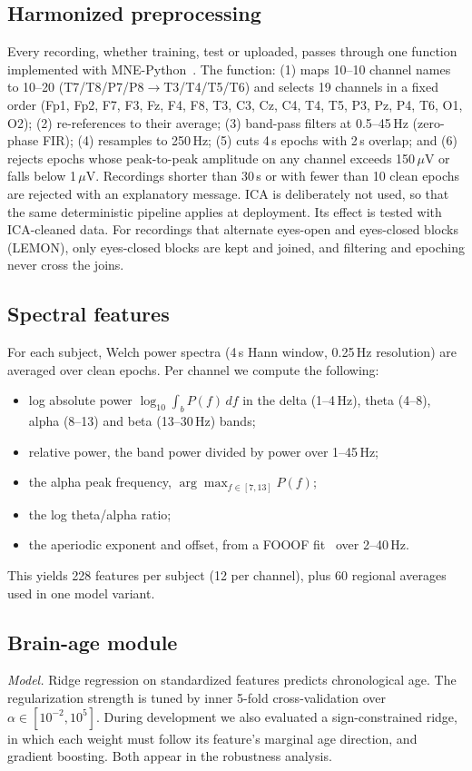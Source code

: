 \documentclass[journal]{IEEEtran}
\begin{document}
\subsection{Harmonized preprocessing}
Every recording, whether training, test or uploaded, passes through one function implemented with MNE-Python~\cite{mne}. The function: (1) maps 10--10 channel names to 10--20 (T7/T8/P7/P8$\rightarrow$T3/T4/T5/T6) and selects 19 channels in a fixed order (Fp1, Fp2, F7, F3, Fz, F4, F8, T3, C3, Cz, C4, T4, T5, P3, Pz, P4, T6, O1, O2); (2) re-references to their average; (3) band-pass filters at 0.5--45\,Hz (zero-phase FIR); (4) resamples to 250\,Hz; (5) cuts 4\,s epochs with 2\,s overlap; and (6) rejects epochs whose peak-to-peak amplitude on any channel exceeds 150\,$\mu$V or falls below 1\,$\mu$V. Recordings shorter than 30\,s or with fewer than 10 clean epochs are rejected with an explanatory message. ICA is deliberately not used, so that the same deterministic pipeline applies at deployment. Its effect is tested with ICA-cleaned data. For recordings that alternate eyes-open and eyes-closed blocks (LEMON), only eyes-closed blocks are kept and joined, and filtering and epoching never cross the joins.

\subsection{Spectral features}
For each subject, Welch power spectra (4\,s Hann window, 0.25\,Hz resolution) are averaged over clean epochs. Per channel we compute the following:
\begin{itemize}
\item log absolute power $\log_{10}\!\int_{b} P(f)\,df$ in the delta (1--4\,Hz), theta (4--8), alpha (8--13) and beta (13--30\,Hz) bands;
\item relative power, the band power divided by power over 1--45\,Hz;
\item the alpha peak frequency, $\arg\max_{f\in[7,13]}P(f)$;
\item the log theta/alpha ratio;
\item the aperiodic exponent and offset, from a FOOOF fit~\cite{fooof} over 2--40\,Hz.
\end{itemize}
This yields 228 features per subject (12 per channel), plus 60 regional averages used in one model variant.

\subsection{Brain-age module}
\emph{Model.} Ridge regression on standardized features predicts chronological age. The regularization strength is tuned by inner 5-fold cross-validation over $\alpha\in[10^{-2},10^{5}]$. During development we also evaluated a sign-constrained ridge, in which each weight must follow its feature's marginal age direction, and gradient boosting. Both appear in the robustness analysis.
\end{document}
